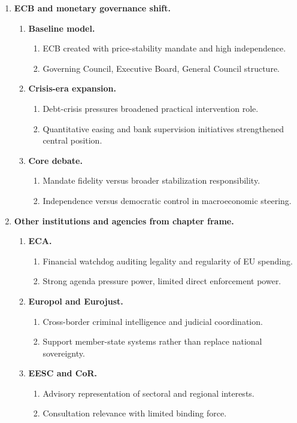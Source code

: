 \documentclass[12pt]{article}
\begin{document}
\begin{enumerate}[label=\Roman*.]
    \item \textbf{ECB and monetary governance shift.}
    \begin{enumerate}[label=\Alph*.]
        \item \textbf{Baseline model.}
        \begin{enumerate}
            \item ECB created with price-stability mandate and high independence.
            \item Governing Council, Executive Board, General Council structure.
        \end{enumerate}
        \item \textbf{Crisis-era expansion.}
        \begin{enumerate}
            \item Debt-crisis pressures broadened practical intervention role.
            \item Quantitative easing and bank supervision initiatives strengthened central position.
        \end{enumerate}
        \item \textbf{Core debate.}
        \begin{enumerate}
            \item Mandate fidelity versus broader stabilization responsibility.
            \item Independence versus democratic control in macroeconomic steering.
        \end{enumerate}
    \end{enumerate}

    \item \textbf{Other institutions and agencies from chapter frame.}
    \begin{enumerate}[label=\Alph*.]
        \item \textbf{ECA.}
        \begin{enumerate}
            \item Financial watchdog auditing legality and regularity of EU spending.
            \item Strong agenda pressure power, limited direct enforcement power.
        \end{enumerate}
        \item \textbf{Europol and Eurojust.}
        \begin{enumerate}
            \item Cross-border criminal intelligence and judicial coordination.
            \item Support member-state systems rather than replace national sovereignty.
        \end{enumerate}
        \item \textbf{EESC and CoR.}
        \begin{enumerate}
            \item Advisory representation of sectoral and regional interests.
            \item Consultation relevance with limited binding force.
        \end{enumerate}
    \end{enumerate}
\end{enumerate}
\end{document}
